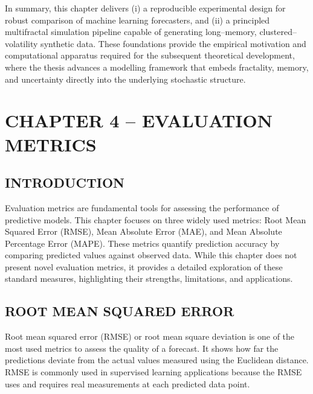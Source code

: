 \documentclass[12pt,a4paper]{report}
\numberwithin{equation}{section}
\begin{document}
In summary, this chapter delivers (i) a reproducible experimental design for robust comparison of machine learning forecasters, and (ii) a principled multifractal simulation pipeline capable of generating long--memory, clustered--volatility synthetic data. These foundations provide the empirical motivation and computational apparatus required for the subsequent theoretical development, where the thesis advances a modelling framework that embeds fractality, memory, and uncertainty directly into the underlying stochastic structure.

\hypertarget{chapter--4--evaluation--metrics}{%
\chapter{\texorpdfstring{\textbf{CHAPTER 4 -- EVALUATION
METRICS}}{CHAPTER 4 ---- EVALUATION METRICS}}\label{chapter--4--evaluation--metrics}}

\hypertarget{introduction--2}{%
\section{\texorpdfstring{\textbf{
INTRODUCTION}}{INTRODUCTION}}\label{introduction--2}}

Evaluation metrics are fundamental tools for assessing the performance
of predictive models. This chapter focuses on three widely used metrics:
Root Mean Squared Error (RMSE), Mean Absolute Error (MAE), and Mean
Absolute Percentage Error (MAPE). These metrics quantify prediction
accuracy by comparing predicted values against observed data. While this
chapter does not present novel evaluation metrics, it provides a
detailed exploration of these standard measures, highlighting their
strengths, limitations, and applications.

\hypertarget{root--mean--squared--error}{%
\section{\texorpdfstring{\textbf{ROOT MEAN SQUARED
ERROR}}{ROOT MEAN SQUARED ERROR}}\label{root--mean--squared--error}}

Root mean squared error (RMSE) \cite{moody2019what_73} or root mean square deviation is
one of the most used metrics to assess the quality of a forecast. It
shows how far the predictions deviate from the actual values
\hspace{0pt}\hspace{0pt}measured using the Euclidean distance. RMSE is
commonly used in supervised learning applications because the RMSE uses
and requires real measurements at each predicted data point.
\end{document}
